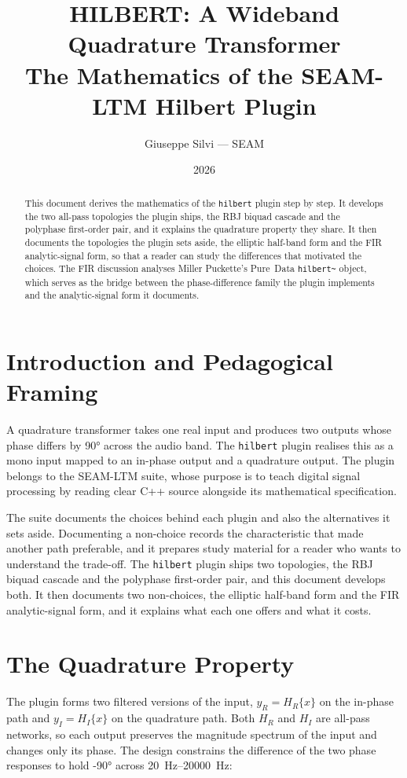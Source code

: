 \documentclass[11pt,a4paper]{article}
\title{HILBERT: A Wideband Quadrature Transformer\\\large The Mathematics of the SEAM-LTM Hilbert Plugin}
\author{Giuseppe Silvi --- SEAM}
\date{2026}
\begin{document}
\maketitle
\begin{abstract}
This document derives the mathematics of the \texttt{hilbert} plugin step by step.
It develops the two all-pass topologies the plugin ships, the RBJ biquad cascade and the polyphase first-order pair, and it explains the quadrature property they share.
It then documents the topologies the plugin sets aside, the elliptic half-band form and the FIR analytic-signal form, so that a reader can study the differences that motivated the choices.
The FIR discussion analyses Miller Puckette's Pure~Data \texttt{hilbert\textasciitilde} object, which serves as the bridge between the phase-difference family the plugin implements and the analytic-signal form it documents.
\end{abstract}
\tableofcontents

\section{Introduction and Pedagogical Framing}

A quadrature transformer takes one real input and produces two outputs whose phase differs by \ang{90} across the audio band.
The \texttt{hilbert} plugin realises this as a mono input mapped to an in-phase output and a quadrature output.
The plugin belongs to the SEAM-LTM suite, whose purpose is to teach digital signal processing by reading clear C++ source alongside its mathematical specification.

The suite documents the choices behind each plugin and also the alternatives it sets aside.
Documenting a non-choice records the characteristic that made another path preferable, and it prepares study material for a reader who wants to understand the trade-off.
The \texttt{hilbert} plugin ships two topologies, the RBJ biquad cascade and the polyphase first-order pair, and this document develops both.
It then documents two non-choices, the elliptic half-band form and the FIR analytic-signal form, and it explains what each one offers and what it costs.

\section{The Quadrature Property}

The plugin forms two filtered versions of the input, $y_R = H_R\{x\}$ on the in-phase path and $y_I = H_I\{x\}$ on the quadrature path.
Both $H_R$ and $H_I$ are all-pass networks, so each output preserves the magnitude spectrum of the input and changes only its phase.
The design constrains the difference of the two phase responses to hold \ang{-90} across \SIrange{20}{20000}{\hertz}:
\end{document}
